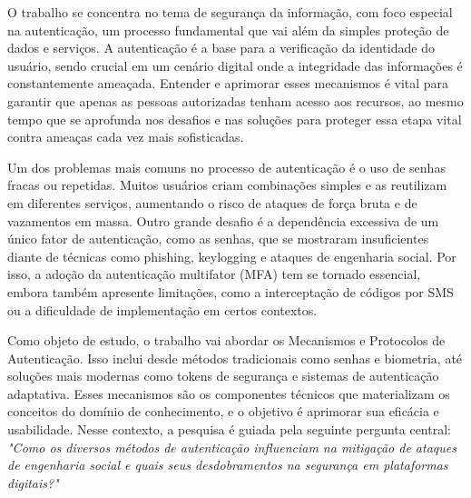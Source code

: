 %
%
%

O trabalho se concentra no tema de segurança da informação, com foco especial na autenticação, um processo fundamental que vai além da simples proteção de dados e serviços. A autenticação é a base para a verificação da identidade do usuário, sendo crucial em um cenário digital onde a integridade das informações é constantemente ameaçada. Entender e aprimorar esses mecanismos é vital para garantir que apenas as pessoas autorizadas tenham acesso aos recursos, ao mesmo tempo que se aprofunda nos desafios e nas soluções para proteger essa etapa vital contra ameaças cada vez mais sofisticadas.

Um dos problemas mais comuns no processo de autenticação é o uso de senhas fracas ou repetidas. Muitos usuários criam combinações simples e as reutilizam em diferentes serviços, aumentando o risco de ataques de força bruta e de vazamentos em massa. Outro grande desafio é a dependência excessiva de um único fator de autenticação, como as senhas, que se mostraram insuficientes diante de técnicas como phishing, keylogging e ataques de engenharia social. Por isso, a adoção da autenticação multifator (MFA) tem se tornado essencial, embora também apresente limitações, como a interceptação de códigos por SMS ou a dificuldade de implementação em certos contextos.

Como objeto de estudo, o trabalho vai abordar os Mecanismos e Protocolos de Autenticação. Isso inclui desde métodos tradicionais como senhas e biometria, até soluções mais modernas como tokens de segurança e sistemas de autenticação adaptativa. Esses mecanismos são os componentes técnicos que materializam os conceitos do domínio de conhecimento, e o objetivo é aprimorar sua eficácia e usabilidade.
Nesse contexto, a pesquisa é guiada pela seguinte pergunta central:\textit{ "Como os diversos métodos de autenticação influenciam na mitigação de ataques de engenharia social e quais seus desdobramentos na segurança em plataformas digitais?"}
